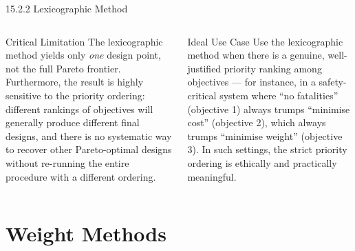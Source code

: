 \documentclass[aspectratio=169,10pt]{beamer}
\begin{document}
\begin{frame}[allowframebreaks]{15.2.2 Lexicographic Method}
\begin{columns}
\begin{alertblock}{Critical Limitation}
  The lexicographic method yields only \emph{one} design point, not the full
  Pareto frontier.  Furthermore, the result is highly sensitive to the
  priority ordering: different rankings of objectives will generally produce
  different final designs, and there is no systematic way to recover other
  Pareto-optimal designs without re-running the entire procedure with a
  different ordering.
\end{alertblock}

\begin{exampleblock}{Ideal Use Case}
  Use the lexicographic method when there is a genuine, well-justified
  priority ranking among objectives --- for instance, in a safety-critical
  system where ``no fatalities'' (objective 1) always trumps ``minimise cost''
  (objective 2), which always trumps ``minimise weight'' (objective 3).  In
  such settings, the strict priority ordering is ethically and practically
  meaningful.
\end{exampleblock}
\end{columns}

\end{frame}

\section{Weight Methods}
\end{document}
